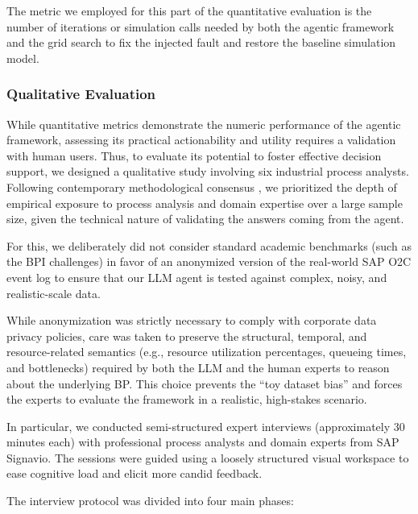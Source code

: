 \documentclass[preprint,12pt]{elsarticle}
\begin{document}
The metric we employed for this part of the quantitative evaluation is the number of iterations or simulation calls needed by both the agentic framework and the grid search to fix the injected fault and restore the baseline simulation model.

\subsubsection{Qualitative Evaluation}
\label{sec:qualitative_setup}

While quantitative metrics demonstrate the numeric performance of the agentic framework, assessing its practical actionability and utility requires a validation with human users. Thus, to evaluate its potential to foster effective decision support, we designed a qualitative study involving six industrial process analysts. Following contemporary methodological consensus \citep{elmholdt2026many}, we prioritized the depth of empirical exposure to process analysis and domain expertise over a large sample size, given the technical nature of validating the answers coming from the agent.

For this, we deliberately did not consider standard academic benchmarks (such as the BPI challenges) in favor of an anonymized version of the real-world SAP O2C event log to ensure that our LLM agent is tested against complex, noisy, and realistic-scale data.

While anonymization was strictly necessary to comply with corporate data privacy policies, care was taken to preserve the structural, temporal, and resource-related semantics (e.g., resource utilization percentages, queueing times, and bottlenecks) required by both the LLM and the human experts to reason about the underlying BP. This choice prevents the ``toy dataset bias'' and forces the experts to evaluate the framework in a realistic, high-stakes scenario.

In particular, we conducted semi-structured expert interviews (approximately 30 minutes each) with professional process analysts and domain experts from SAP Signavio. The sessions were guided using a loosely structured visual workspace to ease cognitive load and elicit more candid feedback.

The interview protocol was divided into four main phases:
\end{document}
